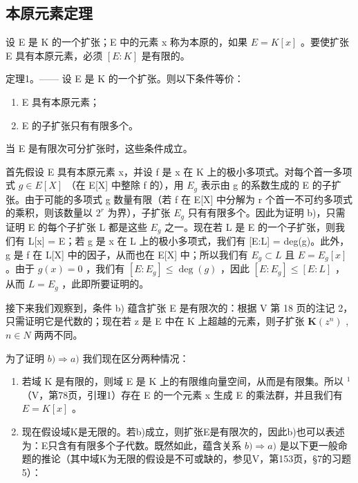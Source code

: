 \subsection{本原元素定理}

设 E 是 K 的一个扩张；E 中的元素 x 称为本原的，如果 \(E = K[x]\) 。要使扩张 E 具有本原元素，必须 \([E : K]\) 是有限的。

定理1。—— 设 E 是 K 的一个扩张。则以下条件等价：

\begin{enumerate}
\def\labelenumi{\alph{enumi})}
\item
  E 具有本原元素；
\item
  E 的子扩张只有有限多个。
\end{enumerate}

当 E 是有限次可分扩张时，这些条件成立。

首先假设 E 具有本原元素 x，并设 f 是 x 在 K 上的极小多项式。对每个首一多项式 \(g \in E[X]\) （在 E{[}X{]} 中整除 f 的），用 \(E_g\) 表示由 g 的系数生成的 E 的子扩张。由于可能的多项式 g 数量有限（若 f 在 E{[}X{]} 中分解为 r 个首一不可约多项式的乘积，则该数量以 \(2^{r}\) 为界），子扩张 \(E_g\) 只有有限多个。因此为证明 b)，只需证明 E 的每个子扩张 L 都是这些 \(E_g\) 之一。现在若 L 是 E 的一个子扩张，则我们有 L{[}x{]} = E；若 g 是 x 在 L 上的极小多项式，我们有 {[}E:L{]} = deg(g)。此外，g 是 f 在 L{[}X{]} 中的因子，从而也在 E{[}X{]} 中；所以我们有 \(E_g \subset L\) 且 \(E = E_g[x]\) 。由于 \(g(x) = 0\) ，我们有 \([E : E_g] \leq \deg(g)\) ，因此 \([E : E_g] \leq [E : L]\) ，从而 \(L = E_g\) ，此即所要证明的。

接下来我们观察到，条件 b) 蕴含扩张 E 是有限次的：根据 V 第 18 页的注记 2，只需证明它是代数的；现在若 z 是 E 中在 K 上超越的元素，则子扩张 \(\mathbf{K}(z^{n})\) , \(n \in N\) 两两不同。

为了证明 \(b) \Rightarrow a)\) 我们现在区分两种情况：

\begin{enumerate}
\def\labelenumi{\Alph{enumi})}
\item
  若域 K 是有限的，则域 E 是 K 上的有限维向量空间，从而是有限集。所以 \({}^{1}\) （V，第78页，引理1）存在 E 的一个元素 x 生成 E 的乘法群，并且我们有 \(E = K[x]\) 。
\item
  现在假设域K是无限的。若b)成立，则扩张E是有限次的，因此b)也可以表述为：E只含有有限多个子代数。既然如此，蕴含关系 \(b) \Rightarrow a)\) 是以下更一般命题的推论（其中域K为无限的假设是不可或缺的，参见V，第153页，§7的习题5）：
\end{enumerate}

